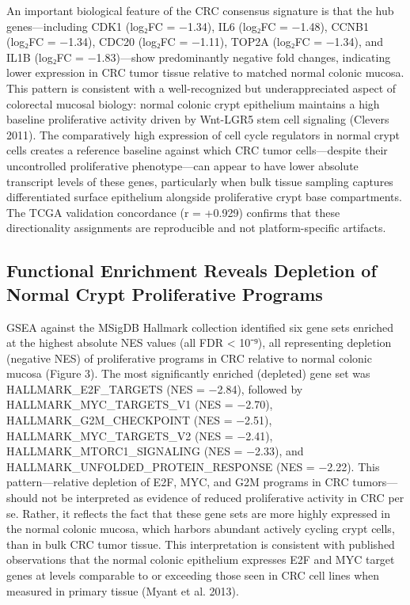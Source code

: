 \documentclass[
  12pt,
]{article}
\begin{document}
An important biological feature of the CRC consensus signature is that
the hub genes---including CDK1 (log₂FC = −1.34), IL6 (log₂FC = −1.48),
CCNB1 (log₂FC = −1.34), CDC20 (log₂FC = −1.11), TOP2A (log₂FC = −1.34),
and IL1B (log₂FC = −1.83)---show predominantly negative fold changes,
indicating lower expression in CRC tumor tissue relative to matched
normal colonic mucosa. This pattern is consistent with a well-recognized
but underappreciated aspect of colorectal mucosal biology: normal
colonic crypt epithelium maintains a high baseline proliferative
activity driven by Wnt-LGR5 stem cell signaling (Clevers 2011). The
comparatively high expression of cell cycle regulators in normal crypt
cells creates a reference baseline against which CRC tumor
cells---despite their uncontrolled proliferative phenotype---can appear
to have lower absolute transcript levels of these genes, particularly
when bulk tissue sampling captures differentiated surface epithelium
alongside proliferative crypt base compartments. The TCGA validation
concordance (r = +0.929) confirms that these directionality assignments
are reproducible and not platform-specific artifacts.

\subsection{Functional Enrichment Reveals Depletion of Normal Crypt
Proliferative
Programs}\label{functional-enrichment-reveals-depletion-of-normal-crypt-proliferative-programs}

GSEA against the MSigDB Hallmark collection identified six gene sets
enriched at the highest absolute NES values (all FDR \textless{} 10⁻⁹),
all representing depletion (negative NES) of proliferative programs in
CRC relative to normal colonic mucosa (Figure 3). The most significantly
enriched (depleted) gene set was HALLMARK\_E2F\_TARGETS (NES = −2.84),
followed by HALLMARK\_MYC\_TARGETS\_V1 (NES = −2.70),
HALLMARK\_G2M\_CHECKPOINT (NES = −2.51), HALLMARK\_MYC\_TARGETS\_V2 (NES
= −2.41), HALLMARK\_MTORC1\_SIGNALING (NES = −2.33), and
HALLMARK\_UNFOLDED\_PROTEIN\_RESPONSE (NES = −2.22). This
pattern---relative depletion of E2F, MYC, and G2M programs in CRC
tumors---should not be interpreted as evidence of reduced proliferative
activity in CRC per se. Rather, it reflects the fact that these gene
sets are more highly expressed in the normal colonic mucosa, which
harbors abundant actively cycling crypt cells, than in bulk CRC tumor
tissue. This interpretation is consistent with published observations
that the normal colonic epithelium expresses E2F and MYC target genes at
levels comparable to or exceeding those seen in CRC cell lines when
measured in primary tissue (Myant et al. 2013).
\end{document}
